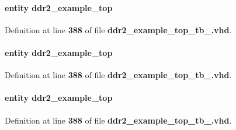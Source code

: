 \paragraph[{dut}]{ {\bfseries \textcolor{keywordflow}{entity}\textcolor{vhdlchar}{ }\textcolor{vhdlchar}{ddr2\+\_\+example\+\_\+top}\textcolor{vhdlchar}{ }} \hspace{0.3cm}{\ttfamily [Instantiation]}}\label{classddr2__example__top__tb_1_1rtl_a623de4718fe48a8e036a1041bd516956}


Definition at line {\bf 388} of file {\bf ddr2\+\_\+example\+\_\+top\+\_\+tb\+\_.\+vhd}.

\paragraph[{dut}]{ {\bfseries \textcolor{keywordflow}{entity}\textcolor{vhdlchar}{ }\textcolor{vhdlchar}{ddr2\+\_\+example\+\_\+top}\textcolor{vhdlchar}{ }} \hspace{0.3cm}{\ttfamily [Instantiation]}}\label{classddr2__example__top__tb_1_1rtl_a623de4718fe48a8e036a1041bd516956}


Definition at line {\bf 388} of file {\bf ddr2\+\_\+example\+\_\+top\+\_\+tb\+\_.\+vhd}.

\paragraph[{dut}]{ {\bfseries \textcolor{keywordflow}{entity}\textcolor{vhdlchar}{ }\textcolor{vhdlchar}{ddr2\+\_\+example\+\_\+top}\textcolor{vhdlchar}{ }} \hspace{0.3cm}{\ttfamily [Instantiation]}}\label{classddr2__example__top__tb_1_1rtl_a623de4718fe48a8e036a1041bd516956}


Definition at line {\bf 388} of file {\bf ddr2\+\_\+example\+\_\+top\+\_\+tb\+\_.\+vhd}.

